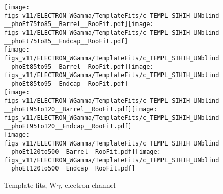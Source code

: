 \begin{figure}[htb]
  \begin{center}
   \texttt{[image: figs\_v11/ELECTRON\_WGamma/TemplateFits/c\_TEMPL\_SIHIH\_UNblind\_\_phoEt75to85\_\_Barrel\_\_RooFit.pdf]}\texttt{[image: figs\_v11/ELECTRON\_WGamma/TemplateFits/c\_TEMPL\_SIHIH\_UNblind\_\_phoEt75to85\_\_Endcap\_\_RooFit.pdf]}\\
   \texttt{[image: figs\_v11/ELECTRON\_WGamma/TemplateFits/c\_TEMPL\_SIHIH\_UNblind\_\_phoEt85to95\_\_Barrel\_\_RooFit.pdf]}\texttt{[image: figs\_v11/ELECTRON\_WGamma/TemplateFits/c\_TEMPL\_SIHIH\_UNblind\_\_phoEt85to95\_\_Endcap\_\_RooFit.pdf]}\\
   \texttt{[image: figs\_v11/ELECTRON\_WGamma/TemplateFits/c\_TEMPL\_SIHIH\_UNblind\_\_phoEt95to120\_\_Barrel\_\_RooFit.pdf]}\texttt{[image: figs\_v11/ELECTRON\_WGamma/TemplateFits/c\_TEMPL\_SIHIH\_UNblind\_\_phoEt95to120\_\_Endcap\_\_RooFit.pdf]}\\
   \texttt{[image: figs\_v11/ELECTRON\_WGamma/TemplateFits/c\_TEMPL\_SIHIH\_UNblind\_\_phoEt120to500\_\_Barrel\_\_RooFit.pdf]}\texttt{[image: figs\_v11/ELECTRON\_WGamma/TemplateFits/c\_TEMPL\_SIHIH\_UNblind\_\_phoEt120to500\_\_Endcap\_\_RooFit.pdf]}\\
  \label{fig:templateFits_SIHIH_ELECTRON_3}
  \caption{Template fits, W$\gamma$, electron channel}
  \end{center}
\end{figure}



